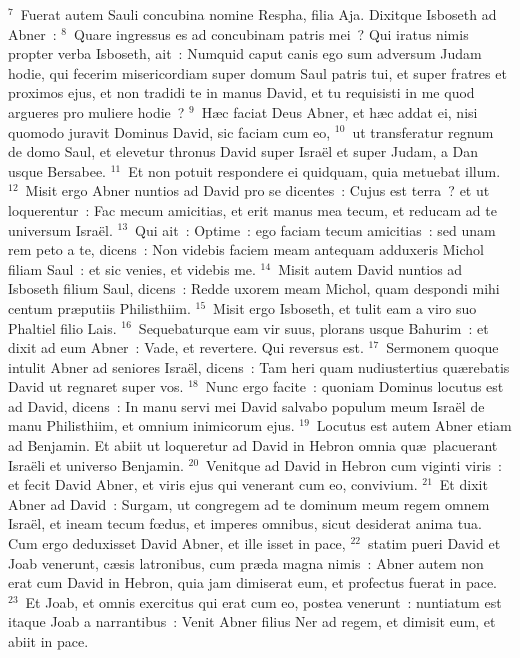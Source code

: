${}^{7}$~Fuerat autem Sauli concubina nomine Respha, filia Aja. Dixitque Isboseth ad Abner~:
${}^{8}$~Quare ingressus es ad concubinam patris mei~? Qui iratus nimis propter verba Isboseth, ait~: Numquid caput canis ego sum adversum Judam hodie, qui fecerim misericordiam super domum Saul patris tui, et super fratres et proximos ejus, et non tradidi te in manus David, et tu requisisti in me quod argueres pro muliere hodie~?
${}^{9}$~H\ae c faciat Deus Abner, et h\ae c addat ei, nisi quomodo juravit Dominus David, sic faciam cum eo,
${}^{10}$~ut transferatur regnum de domo Saul, et elevetur thronus David super Isra\"el et super Judam, a Dan usque Bersabee.
${}^{11}$~Et non potuit respondere ei quidquam, quia metuebat illum.
${}^{12}$~Misit ergo Abner nuntios ad David pro se dicentes~: Cujus est terra~? et ut loquerentur~: Fac mecum amicitias, et erit manus mea tecum, et reducam ad te universum Isra\"el.
${}^{13}$~Qui ait~: Optime~: ego faciam tecum amicitias~: sed unam rem peto a te, dicens~: Non videbis faciem meam antequam adduxeris Michol filiam Saul~: et sic venies, et videbis me.
${}^{14}$~Misit autem David nuntios ad Isboseth filium Saul, dicens~: Redde uxorem meam Michol, quam despondi mihi centum pr\ae putiis Philisthiim.
${}^{15}$~Misit ergo Isboseth, et tulit eam a viro suo Phaltiel filio Lais.
${}^{16}$~Sequebaturque eam vir suus, plorans usque Bahurim~: et dixit ad eum Abner~: Vade, et revertere. Qui reversus est.
${}^{17}$~Sermonem quoque intulit Abner ad seniores Isra\"el, dicens~: Tam heri quam nudiustertius qu\ae rebatis David ut regnaret super vos.
${}^{18}$~Nunc ergo facite~: quoniam Dominus locutus est ad David, dicens~: In manu servi mei David salvabo populum meum Isra\"el de manu Philisthiim, et omnium inimicorum ejus.
${}^{19}$~Locutus est autem Abner etiam ad Benjamin. Et abiit ut loqueretur ad David in Hebron omnia qu\ae\ placuerant Isra\"eli et universo Benjamin.
${}^{20}$~Venitque ad David in Hebron cum viginti viris~: et fecit David Abner, et viris ejus qui venerant cum eo, convivium.
${}^{21}$~Et dixit Abner ad David~: Surgam, ut congregem ad te dominum meum regem omnem Isra\"el, et ineam tecum fœdus, et imperes omnibus, sicut desiderat anima tua. Cum ergo deduxisset David Abner, et ille isset in pace,
${}^{22}$~statim pueri David et Joab venerunt, c\ae sis latronibus, cum pr\ae da magna nimis~: Abner autem non erat cum David in Hebron, quia jam dimiserat eum, et profectus fuerat in pace.
${}^{23}$~Et Joab, et omnis exercitus qui erat cum eo, postea venerunt~: nuntiatum est itaque Joab a narrantibus~: Venit Abner filius Ner ad regem, et dimisit eum, et abiit in pace.


